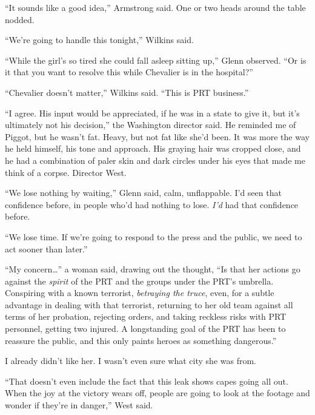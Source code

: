 ``It sounds like a good idea,'' Armstrong said.  One or two heads around the table nodded.



``We're going to handle this tonight,'' Wilkins said.



``While the girl's so tired she could fall asleep sitting up,'' Glenn observed.  ``Or is it that you want to resolve this while Chevalier is in the hospital?''



``Chevalier doesn't matter,'' Wilkins said.  ``This is PRT business.''



``I agree.  His input would be appreciated, if he was in a state to give it, but it's ultimately not his decision,'' the Washington director said.  He reminded me of Piggot, but he wasn't fat.    Heavy, but not fat like she'd been.  It was more the way he held himself, his tone and approach.  His graying hair was cropped close, and he had a combination of paler skin and dark circles under his eyes that made me think of a corpse.  Director West.



``We lose nothing by waiting,'' Glenn said, calm, unflappable.  I'd seen that confidence before, in people who'd had nothing to lose.  \emph{I'd} had that confidence before.



``We lose time.  If we're going to respond to the press and the public, we need to act sooner than later.''



``My concern\ldots'' a woman said, drawing out the thought, ``Is that her actions go against the \emph{spirit} of the PRT and the groups under the PRT's umbrella.  Conspiring with a known terrorist, \emph{betraying the truce}, even, for a subtle advantage in dealing with that terrorist, returning to her old team against all terms of her probation, rejecting orders, and taking reckless risks with PRT personnel, getting two injured.  A longstanding goal of the PRT has been to reassure the public, and this only paints heroes as something dangerous.''



I already didn't like her.  I wasn't even sure what city she was from.



``That doesn't even include the fact that this leak shows capes going all out.  When the joy at the victory wears off, people are going to look at the footage and wonder if they're in danger,'' West said.



